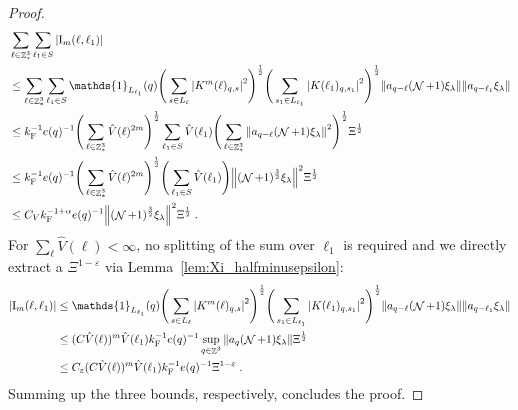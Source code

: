 \documentclass[12pt,a4paper]{article}
\numberwithin{equation}{section}
\newcommand{\1}{\mathbb{I}}
\newcommand{\F}{\mathrm{F}}
\newcommand{\I}{\mathrm{I}}
\DeclareMathOperator{\Z}{\mathbb{Z}}
\DeclareMathOperator{\NN}{\mathcal{N}}
\newcommand{\half}{\frac{1}{2}}
\theoremstyle{plain}
\theoremstyle{definition}
\theoremstyle{remark}
\theoremstyle{plain}
\theoremstyle{definition}
\theoremstyle{remark}
\begin{document}
\begin{proof}
{\begin{align}
	&\sum_{\ell \in \Z^3_*} \sum_{\ell_1 \in S} |\I_m(\ell, \ell_1)| \nonumber\\
	&\leq \sum_{\ell \in \Z^3_*} \sum_{\ell_1 \in S} \mathds{1}_{L_{\ell_1}}(q) \Bigg(\sum\limits_{s \in L_{\ell}} \abs{K^m(\ell)_{q,s}}^2\Bigg)^\half
		\Bigg(\sum\limits_{s_1 \in L_{\ell_1}} \abs{K(\ell_1)_{q,s_1}}^2\Bigg)^\half
		\norm{ a_{q-\ell} (\NN+1) \xi_\lambda}
		\norm{ a_{q-\ell_1} \xi_\lambda }\nonumber\\
	&\leq k_{\F}^{-1} e(q)^{-1}
		\Bigg( \sum_{\ell \in \Z^3_*} \hat{V}(\ell)^{2m} \Bigg)^{\half}
		\sum_{\ell_1 \in S} \hat{V}(\ell_1)
		\Bigg( \sum_{\ell \in \Z^3_*} \norm{ a_{q-\ell} (\NN+1) \xi_\lambda}^2 \Bigg)^{\half}
		\Xi^{\half} \nonumber\\
	&\leq k_{\F}^{-1} e(q)^{-1}
		\Bigg( \sum_{\ell \in \Z^3_*} \hat{V}(\ell)^{2m} \Bigg)^{\half}
		\Bigg( \sum_{\ell_1 \in S} \hat{V}(\ell_1) \Bigg) \norm{(\NN+1)^{\frac 32} \xi_\lambda}^2 \Xi^{\half} \nonumber\\
	&\leq C_V k_{\F}^{-1 + \alpha} e(q)^{-1}
		\norm{(\NN+1)^{\frac 32} \xi_\lambda}^2 \Xi^{\half} \;. \label{eq:estEQ2113_Coulomb_2}
\end{align}
}
For $ \sum_\ell \hat{V}(\ell) < \infty $, no splitting of the sum over $ \ell_1 $ is required and we directly extract a $ \Xi^{1-\varepsilon} $ via Lemma~\ref{lem:Xi_halfminusepsilon}:
\begin{align}
	|\I_m(\ell, \ell_1)|
	&\leq \mathds{1}_{L_{\ell_1}}(q) \Bigg(\sum\limits_{s \in L_{\ell}} \abs{K^m(\ell)_{q,s}}^2\Bigg)^\half
		\Bigg(\sum\limits_{s_1 \in L_{\ell_1}} \abs{K(\ell_1)_{q,s_1}}^2\Bigg)^\half
		\norm{ a_{q-\ell} (\NN+1) \xi_\lambda}
		\norm{ a_{q-\ell_1} \xi_\lambda }\nonumber\\
	&\leq (C \hat{V}(\ell))^m \hat{V}(\ell_1) k_{\F}^{-1} e(q)^{-1}
		\sup_{q \in \Z^3} \norm{ a_q (\NN+1) \xi_\lambda }\Xi^{\half} \nonumber\\
	&\leq C_\varepsilon (C \hat{V}(\ell))^m
		\hat{V}(\ell_1)
		k_{\F}^{-1} e(q)^{-1} \Xi^{1-\varepsilon} \;. \label{eq:estEQ2113}
\end{align}
Summing up the three bounds, respectively, concludes the proof.
\end{proof}
\end{document}
